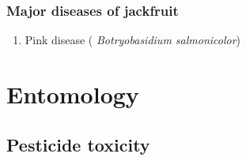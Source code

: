 \documentclass[
  openany]{book}
\providecommand{\tightlist}{%
  \setlength{\itemsep}{0pt}\setlength{\parskip}{0pt}}
\begin{document}
\hypertarget{major-diseases-of-jackfruit}{%
\subsection{Major diseases of jackfruit}\label{major-diseases-of-jackfruit}}

\begin{enumerate}
\def\labelenumi{\arabic{enumi}.}
\tightlist
\item
  Pink disease ( \emph{Botryobasidium salmonicolor})
\end{enumerate}

\hypertarget{entomology}{%
\chapter{Entomology}\label{entomology}}

\hypertarget{pesticide-toxicity}{%
\section{Pesticide toxicity}\label{pesticide-toxicity}}
\end{document}
